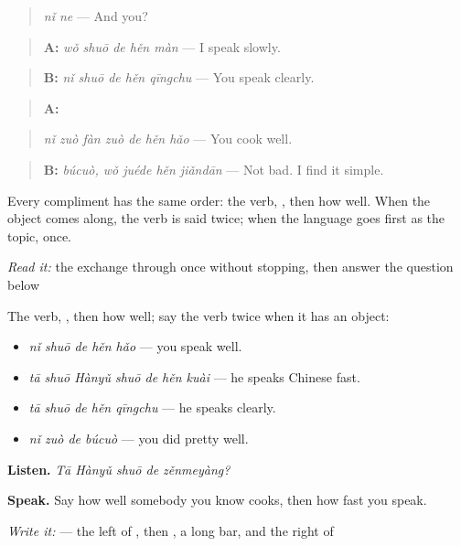 \begin{quote}
\emph{nǐ ne} — And you?
\end{quote}

\begin{quote}
\textbf{A:} \emph{wǒ shuō de hěn màn} — I speak slowly.
\end{quote}

\begin{quote}
\textbf{B:} \emph{nǐ shuō de hěn qīngchu} — You speak clearly.
\end{quote}

\begin{quote}
\textbf{A:} 
\end{quote}

\begin{quote}
\emph{nǐ zuò fàn zuò de hěn hǎo} — You cook well.
\end{quote}

\begin{quote}
\textbf{B:} \emph{búcuò, wǒ juéde hěn jiǎndān} — Not bad. I find it simple.
\end{quote}

Every compliment has the same order: the verb, , then how well. When the object comes along, the verb is said twice; when the language goes first as the topic, once.

\begin{tcolorbox}[breakable,skin=enhanced,colback=orange!6,colframe=orange!45!black,boxrule=0.5pt,arc=1mm,left=6pt,right=6pt,top=4pt,bottom=4pt,fonttitle=\bfseries,title={Read this}]
\emph{Read it:} the exchange through once without stopping, then answer the question below
\end{tcolorbox}

\begin{grammarlens}[title={What you've built — how well}]
The verb, , then how well; say the verb twice when it has an object:

\begin{itemize}
\raggedright
  \item \textbf{} \emph{nǐ shuō de hěn hǎo} — you speak well.
  \item \textbf{} \emph{tā shuō Hànyǔ shuō de hěn kuài} — he speaks Chinese fast.
  \item \emph{tā shuō de hěn qīngchu} — he speaks clearly.
  \item \emph{nǐ zuò de búcuò} — you did pretty well.
\end{itemize}

\textbf{Listen.} \emph{Tā Hànyǔ shuō de zěnmeyàng?}

\textbf{Speak.} Say how well somebody you know cooks, then how fast you speak.

\emph{Write it:}  — the left of , then , a long bar, and the right of 
\end{grammarlens}

